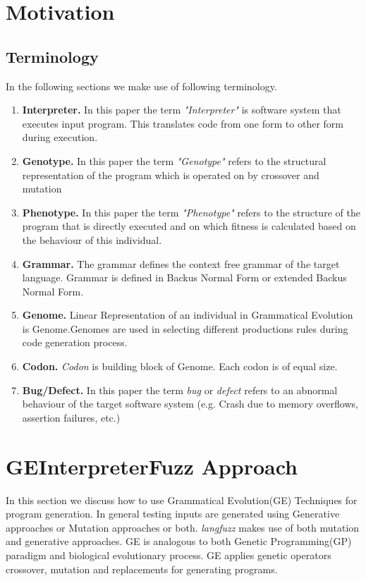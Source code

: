 \documentclass{sig-alternate}
\begin{document}
\section{Motivation} \label{sec:bk}

\subsection{Terminology}
\indent In the following sections we make use of following terminology.
\begin{enumerate}
\item{\textbf{Interpreter.}} In this paper the term \textit{"Interpreter"} is software system that executes input program. This translates code from one form to other form during execution. 
\item{\textbf{Genotype.}} In this paper the term \textit{"Genotype"} refers to the structural representation of the program which is operated on by crossover and mutation
\item{\textbf{Phenotype.}} In this paper the term \textit{"Phenotype"} refers to the structure of the program that is  directly executed and on which fitness is calculated based on the behaviour of this individual.
\item{\textbf{Grammar.}} The grammar defines the context free grammar of the target language. Grammar is defined in Backus Normal Form or extended Backus Normal Form.
\item{\textbf{Genome.}} Linear Representation of an individual in Grammatical Evolution is Genome.Genomes are used in selecting different productions rules during code generation process.
\item{\textbf{Codon.}} \textit{Codon} is building block of Genome. Each codon is of equal size. 
\item{\textbf{Bug/Defect.}} In this paper the term \textit{bug} or \textit{defect} refers to an abnormal behaviour of the target software system (e.g. Crash due to memory overflows, assertion failures, etc.) 
\end{enumerate}

\section{GEInterpreterFuzz Approach} \label{sec:GEIF}
\indent In this section we discuss how to use Grammatical Evolution(GE) Techniques for program generation. In general testing inputs are generated using Generative approaches or Mutation approaches or both. \textit{langfuzz} makes use of both mutation and generative approaches. GE is analogous to both Genetic Programming(GP) paradigm and biological evolutionary process. GE applies genetic operators crossover, mutation and replacements for generating programs. 
\end{document}
